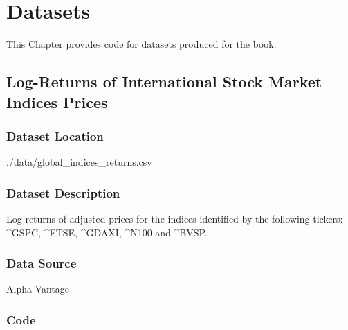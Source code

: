 \documentclass[]{book}
\theoremstyle{definition}
\theoremstyle{definition}
\theoremstyle{definition}
\theoremstyle{remark}
\begin{document}
\chapter{Datasets}\label{datasets}

This Chapter provides code for datasets produced for the book.

\section{Log-Returns of International Stock Market Indices
Prices}\label{dt-indices}

\subsection{Dataset Location}\label{dataset-location}

./data/global\_indices\_returns.csv

\subsection{Dataset Description}\label{dataset-description}

Log-returns of adjusted prices for the indices identified by the
following tickers: \^{}GSPC, \^{}FTSE, \^{}GDAXI, \^{}N100 and \^{}BVSP.

\subsection{Data Source}\label{data-source}

Alpha Vantage

\subsection{Code}\label{code}
\end{document}
